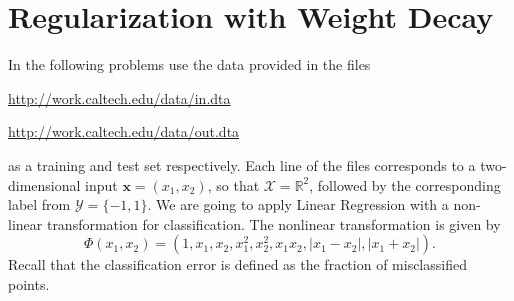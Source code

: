 \documentclass{article}
\newcommand{\R}{\mathbb{R}}
\begin{document}

\section{Regularization with Weight Decay}
In the following problems use the data provided in the files 
\begin{center}
\url{http://work.caltech.edu/data/in.dta}

\url{http://work.caltech.edu/data/out.dta}
\end{center}
as a training and test set respectively. Each line of the files corresponds to a two-dimensional input $\mathbf{x} = (x_1, x_2)$, so that $\mathcal{X} = \R^2$, followed by the corresponding label from $\mathcal{Y} = \{-1, 1\}$. We are going to apply Linear Regression with a non-linear transformation for classification. The nonlinear transformation is given by 
\[
	\Phi(x_1, x_2) = (1, x_1, x_2, x_1^2, x_2^2, x_1 x_2, |x_1 - x_2|, |x_1 + x_2|).
\]
Recall that the classification error is defined as the fraction of misclassified points.
\end{document}
